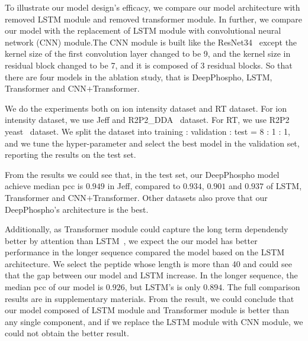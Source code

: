 To illustrate our model design's efficacy, we compare our model architecture with removed LSTM module and removed transformer module. In further, we compare our model with the replacement of LSTM module with convolutional neural network (CNN) module.The CNN module is built like the ResNet34~\cite{he2015deep} except the kernel size of the first convolution layer changed to be 9, and the kernel size in residual block changed to be 7, and it is composed of 3 residual blocks.
So that there are four models in the ablation study, that is DeepPhospho, LSTM, Transformer and CNN$+$Transformer. 

We do the experiments both on ion intensity dataset and RT dataset. For ion intensity dataset, we use Jeff and R2P2\_DDA~\cite{leutert2019r2} dataset. For RT, we use R2P2 yeast~\cite{leutert2019r2} dataset. We split the dataset into training : validation : test = 8 : 1 : 1, and we tune the hyper-parameter and select the best model in the validation set, reporting the results on the test set.

From the results we could see that, in the test set, our DeepPhospho model achieve median pcc is $0.949$ in Jeff, compared to $0.934$, $0.901$ and $0.937$ of LSTM, Transformer and CNN$+$Transformer. Other datasets also prove that our DeepPhospho's architecture is the best.

Additionally, as Transformer module could capture the long term dependendy better by attention than LSTM~\cite{vaswani2017attention}, we expect the our model has better performance in the longer sequence compared the model based on the LSTM architecture. We select the peptide whose length is more than 40 and could see that the gap between our model and LSTM increase. In the longer sequence, the median pcc of our model is $0.926$, but LSTM's is only $0.894$.
The full comparison results are in supplementary materials. From the result, we could conclude that our model composed of LSTM module and Transformer module is better than any single component, and if we replace the LSTM module with CNN module, we could not obtain the better result.

